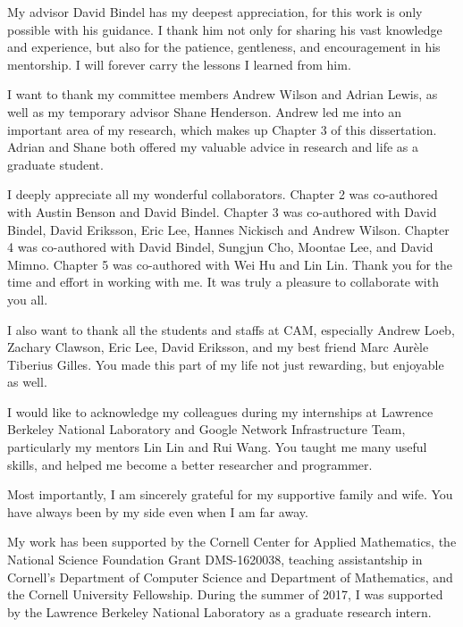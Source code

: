 My advisor David Bindel has my deepest appreciation, for this work is only
possible with his guidance. I thank him not only for sharing his vast knowledge
and experience, but also for the patience, gentleness, and encouragement in his
mentorship. I will forever carry the lessons I learned from him.

I want to thank my committee members Andrew Wilson and Adrian Lewis, as well as
my temporary advisor Shane Henderson. Andrew led me into an important area of my
research, which makes up Chapter 3 of this dissertation. Adrian and Shane both
offered my valuable advice in research and life as a graduate student.

I deeply appreciate all my wonderful collaborators. Chapter 2 was co-authored
with Austin Benson and David Bindel. Chapter 3 was co-authored with David
Bindel, David Eriksson, Eric Lee, Hannes Nickisch and Andrew Wilson. Chapter 4
was co-authored with David Bindel, Sungjun Cho, Moontae Lee, and David Mimno.
Chapter 5 was co-authored with Wei Hu and Lin Lin. Thank you for the time and
effort in working with me. It was truly a pleasure to collaborate with you all.

I also want to thank all the students and staffs at CAM, especially  Andrew
Loeb, Zachary Clawson, Eric Lee, David Eriksson, and my best friend Marc Aur\`
{e}le Tiberius Gilles. You made this part of my life not just rewarding, but
enjoyable as well.

I would like to acknowledge my colleagues during my internships at Lawrence
Berkeley National Laboratory and Google Network Infrastructure Team,
particularly my mentors Lin Lin and Rui Wang. You taught me many useful skills,
and helped me become a better researcher and programmer.

Most importantly, I am sincerely grateful for my supportive family and wife. You
have always been by my side even when I am far away.

My work has been supported by the Cornell Center for Applied Mathematics, the
National Science Foundation Grant DMS-1620038, teaching assistantship in
Cornell's Department of Computer Science and Department of Mathematics, and the
Cornell University Fellowship. During the summer of 2017, I was supported by the
Lawrence Berkeley National Laboratory as a graduate research intern.